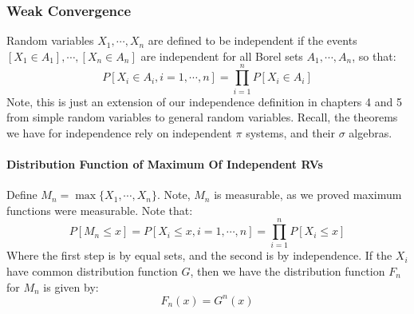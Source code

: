 \documentclass[12pt,a4paper]{article}
\newcommand{\1}[1]{\mathbbm{1}\left\{ #1 \right\}}
\begin{document}
\subsubsection{Weak Convergence}
Random variables $X_1, \cdots, X_n$ are defined to be independent if the events $[X_1 \in A_1], \cdots, [X_n \in A_n]$ are independent for all Borel sets $A_1, \cdots, A_n$, so that:
$$
	P[X_i \in A_i, i = 1, \cdots, n] = \prod_{i=1}^n P[X_i \in A_i]
$$
Note, this is just an extension of our independence definition in chapters 4 and 5 from simple random variables to general random variables. Recall, the theorems we have for independence rely on independent $\pi$ systems, and their $\sigma$ algebras.

\paragraph{Distribution Function of Maximum Of Independent RVs} Define $M_n = \max\{X_1, \cdots, X_n\}$. Note, $M_n$ is measurable, as we proved maximum functions were measurable. Note that:
$$
	P\left[M_n \leq x\right] = P[X_i \leq x, i = 1, \cdots, n] = \prod_{i=1}^n P[X_i \leq x]
$$
Where the first step is by equal sets, and the second is by independence. If the $X_i$ have common distribution function $G$, then we have the distribution function $F_n$ for $M_n$ is given by:
$$
	F_n(x) = G^n(x)
$$
\end{document}
